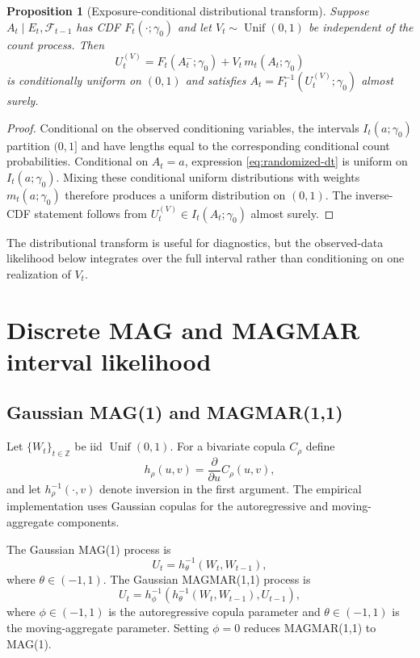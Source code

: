 \documentclass[11pt]{article}
\newtheorem{proposition}[theorem]{Proposition}
\theoremstyle{definition}
\newcommand{\Unif}{\operatorname{Unif}}
\begin{document}
\begin{proposition}[Exposure-conditional distributional transform]
\label{prop:dt}
Suppose $A_t\mid E_t,\mathcal F_{t-1}$ has CDF $F_t(\cdot;\gamma_0)$ and let
$V_t\sim\Unif(0,1)$ be independent of the count process. Then
\begin{equation}
U_t^{(V)}
=
F_t(A_t^-;\gamma_0)
+
V_t\,m_t(A_t;\gamma_0)
\label{eq:randomized-dt}
\end{equation}
is conditionally uniform on $(0,1)$ and satisfies
$A_t=F_t^{-1}(U_t^{(V)};\gamma_0)$ almost surely.
\end{proposition}

\begin{proof}
Conditional on the observed conditioning variables, the intervals
$I_t(a;\gamma_0)$ partition $(0,1]$ and have lengths equal to the corresponding
conditional count probabilities. Conditional on $A_t=a$, expression
\eqref{eq:randomized-dt} is uniform on $I_t(a;\gamma_0)$. Mixing these conditional
uniform distributions with weights $m_t(a;\gamma_0)$ therefore produces a uniform
distribution on $(0,1)$. The inverse-CDF statement follows from
$U_t^{(V)}\in I_t(A_t;\gamma_0)$ almost surely.
\end{proof}

The distributional transform is useful for diagnostics, but the observed-data
likelihood below integrates over the full interval rather than conditioning on one
realization of $V_t$.

\section{Discrete MAG and MAGMAR interval likelihood}
\label{sec:model}

\subsection{Gaussian MAG(1) and MAGMAR(1,1)}

Let $\{W_t\}_{t\in\mathbb Z}$ be iid $\Unif(0,1)$. For a bivariate copula
$C_\rho$ define
\[
h_\rho(u,v)=\frac{\partial}{\partial u}C_\rho(u,v),
\]
and let $h_\rho^{-1}(\cdot,v)$ denote inversion in the first argument. The empirical
implementation uses Gaussian copulas for the autoregressive and moving-aggregate
components.

The Gaussian MAG(1) process is
\begin{equation}
U_t=h_\theta^{-1}(W_t,W_{t-1}),
\label{eq:mag}
\end{equation}
where $\theta\in(-1,1)$. The Gaussian MAGMAR(1,1) process is
\begin{equation}
U_t
=
h_\phi^{-1}\!\left(
 h_\theta^{-1}(W_t,W_{t-1}),
 U_{t-1}
\right),
\label{eq:magmar}
\end{equation}
where $\phi\in(-1,1)$ is the autoregressive copula parameter and
$\theta\in(-1,1)$ is the moving-aggregate parameter. Setting $\phi=0$ reduces
MAGMAR(1,1) to MAG(1).
\end{document}
